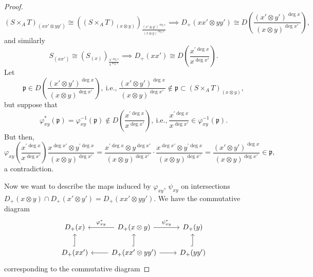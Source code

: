 \documentclass[12pt,letterpaper]{article}
\theoremstyle{definition}
\theoremstyle{remark}
\numberwithin{equation}{section}
\numberwithin{figure}{problem}
\begin{document}
\begin{proof}
  \begin{equation*}
    (S \times_A T)_{(xx' \otimes yy')} \cong ((S \times_A T)_{(x \otimes y)})_{\frac{(x' \otimes y')^{\deg x}}{(x \otimes y)^{\deg x'}}} \implies D_+(xx' \otimes yy') \cong D\left( \frac{(x' \otimes y')^{\deg x}}{(x \otimes y)^{\deg x'}} \right),
  \end{equation*}
  and similarly
  \begin{equation}\label{Sxxiso}
    S_{(xx')} \cong (S_{(x)})_{\frac{x^{\prime\deg x}}{x^{\deg x'}}} \implies D_+(xx') \cong D\left(\frac{x^{\prime\deg x}}{x^{\deg x'}}\right).
  \end{equation}
  Let
  \begin{equation*}
    \mathfrak{p} \in D\left( \frac{(x' \otimes y')^{\deg x}}{(x \otimes y)^{\deg x'}} \right),~\text{i.e.,}~\frac{(x' \otimes y')^{\deg x}}{(x \otimes y)^{\deg x'}} \notin \mathfrak{p} \subset (S \times_A T)_{(x \otimes y)},
  \end{equation*}
  but suppose that
  \begin{equation*}
    \varphi^*_{xy}(\mathfrak{p}) = \varphi^{-1}_{xy}(\mathfrak{p}) \notin D\left(\frac{x^{\prime\deg x}}{x^{\deg x'}}\right),~\text{i.e.,}~\frac{x^{\prime\deg x}}{x^{\deg x'}} \in \varphi^{-1}_{xy}(\mathfrak{p}).
  \end{equation*}
  But then,
  \begin{equation*}
    \varphi_{xy}\left( \frac{x^{\prime\deg x}}{x^{\deg x'}} \right)\frac{x^{\deg x'} \otimes y^{\prime\deg x}}{(x \otimes y)^{\deg x'}} = \frac{x^{\prime\deg x} \otimes y^{\deg x'}}{(x \otimes y)^{\deg x'}}\cdot\frac{x^{\deg x'} \otimes y^{\prime\deg x}}{(x \otimes y)^{\deg x'}} = \frac{(x' \otimes y')^{\deg x}}{(x \otimes y)^{\deg x'}} \in \mathfrak{p},
  \end{equation*}
  a contradiction.
  \par Now we want to describe the maps induced by $\varphi_{xy}$, $\psi_{xy}$ on intersections $D_+(x \otimes y) \cap D_+(x' \otimes y') = D_+(xx' \otimes yy')$. We have the commutative diagram
  \begin{equation*}
    \begin{tikzcd}
      D_+(x) & \arrow{l}[swap]{\varphi^*_{xy}} D_+(x \otimes y) \rar{\psi^*_{xy}} & D_+(y)\\
      D_+(xx')\uar[hook] & \arrow{l} D_+(xx' \otimes yy') \uar[hook]\rar & D_+(yy')\uar[hook]
    \end{tikzcd}
  \end{equation*}
  corresponding to the commutative diagram

\end{proof}
\end{document}
